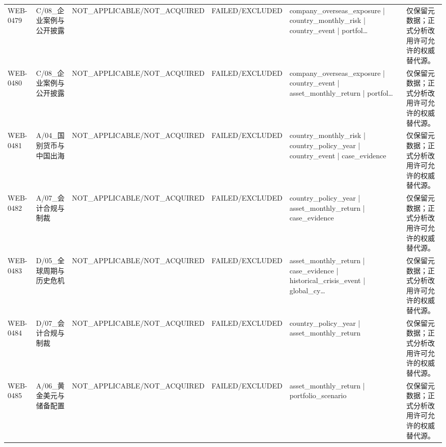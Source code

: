 \begin{landscape}
\begin{longtable}{p{1.8cm}p{2.6cm}p{2.6cm}p{2.6cm}p{4.8cm}p{7.2cm}}
WEB-0479 & C/\allowbreak{}08\_\allowbreak{}企业案例与公开披露 & NOT\_\allowbreak{}APPLICABLE/\allowbreak{}NOT\_\allowbreak{}ACQUIRED & FAILED/\allowbreak{}EXCLUDED & company\_\allowbreak{}overseas\_\allowbreak{}exposure | country\_\allowbreak{}monthly\_\allowbreak{}risk | country\_\allowbreak{}event | portfol… & 仅保留元数据；正式分析改用许可允许的权威替代源。\\
WEB-0480 & C/\allowbreak{}08\_\allowbreak{}企业案例与公开披露 & NOT\_\allowbreak{}APPLICABLE/\allowbreak{}NOT\_\allowbreak{}ACQUIRED & FAILED/\allowbreak{}EXCLUDED & company\_\allowbreak{}overseas\_\allowbreak{}exposure | country\_\allowbreak{}event | asset\_\allowbreak{}monthly\_\allowbreak{}return | portfol… & 仅保留元数据；正式分析改用许可允许的权威替代源。\\
WEB-0481 & A/\allowbreak{}04\_\allowbreak{}国别货币与中国出海 & NOT\_\allowbreak{}APPLICABLE/\allowbreak{}NOT\_\allowbreak{}ACQUIRED & FAILED/\allowbreak{}EXCLUDED & country\_\allowbreak{}monthly\_\allowbreak{}risk | country\_\allowbreak{}policy\_\allowbreak{}year | country\_\allowbreak{}event | case\_\allowbreak{}evidence & 仅保留元数据；正式分析改用许可允许的权威替代源。\\
WEB-0482 & A/\allowbreak{}07\_\allowbreak{}会计合规与制裁 & NOT\_\allowbreak{}APPLICABLE/\allowbreak{}NOT\_\allowbreak{}ACQUIRED & FAILED/\allowbreak{}EXCLUDED & country\_\allowbreak{}policy\_\allowbreak{}year | asset\_\allowbreak{}monthly\_\allowbreak{}return | case\_\allowbreak{}evidence & 仅保留元数据；正式分析改用许可允许的权威替代源。\\
WEB-0483 & D/\allowbreak{}05\_\allowbreak{}全球周期与历史危机 & NOT\_\allowbreak{}APPLICABLE/\allowbreak{}NOT\_\allowbreak{}ACQUIRED & FAILED/\allowbreak{}EXCLUDED & asset\_\allowbreak{}monthly\_\allowbreak{}return | case\_\allowbreak{}evidence | historical\_\allowbreak{}crisis\_\allowbreak{}event | global\_\allowbreak{}cy… & 仅保留元数据；正式分析改用许可允许的权威替代源。\\
WEB-0484 & D/\allowbreak{}07\_\allowbreak{}会计合规与制裁 & NOT\_\allowbreak{}APPLICABLE/\allowbreak{}NOT\_\allowbreak{}ACQUIRED & FAILED/\allowbreak{}EXCLUDED & country\_\allowbreak{}policy\_\allowbreak{}year | asset\_\allowbreak{}monthly\_\allowbreak{}return & 仅保留元数据；正式分析改用许可允许的权威替代源。\\
WEB-0485 & A/\allowbreak{}06\_\allowbreak{}黄金美元与储备配置 & NOT\_\allowbreak{}APPLICABLE/\allowbreak{}NOT\_\allowbreak{}ACQUIRED & FAILED/\allowbreak{}EXCLUDED & asset\_\allowbreak{}monthly\_\allowbreak{}return | portfolio\_\allowbreak{}scenario & 仅保留元数据；正式分析改用许可允许的权威替代源。\\

\end{longtable}
\end{landscape}
